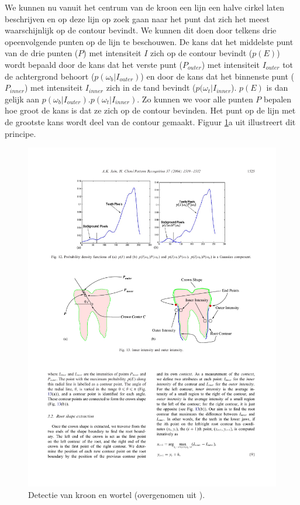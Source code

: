 \documentclass[10pt,a4paper]{article}
\begin{document}
We kunnen nu vanuit het centrum van de kroon een lijn een halve cirkel laten beschrijven en op deze lijn op zoek gaan naar het punt dat zich het meest waarschijnlijk op de contour bevindt. We kunnen dit doen door telkens drie opeenvolgende punten op de lijn te beschouwen. De kans dat het middelste punt van de drie punten ($P$) met intensiteit $I$ zich op de contour bevindt ($p(E)$) wordt bepaald door de kans dat het verste punt ($P_{outer}$) met intensiteit $I_{outer}$ tot de achtergrond behoort ($p(\omega_b|I_{outer})$) en door de kans dat het binnenste punt ($P_{inner}$) met intensiteit $I_{inner}$ zich in de tand bevindt ($p(\omega_t|I_{inner}$). $p(E)$ is dan gelijk aan $p(\omega_b|I_{outer}) . p(\omega_t|I_{inner})$. Zo kunnen we voor alle punten $P$ bepalen hoe groot de kans is dat ze zich op de contour bevinden. Het punt op de lijn met de grootste kans wordt deel van de contour gemaakt. Figuur \ref{fig:contour-tracing}a uit \cite{jain2004matching} illustreert dit principe.

\begin{figure}
  \centering
  \includegraphics[width=.8\linewidth]{resources/contour-tracing.pdf}
  \caption{Detectie van kroon en wortel (overgenomen uit \cite{jain2004matching}).}
  \label{fig:contour-tracing}
\end{figure}
\end{document}
